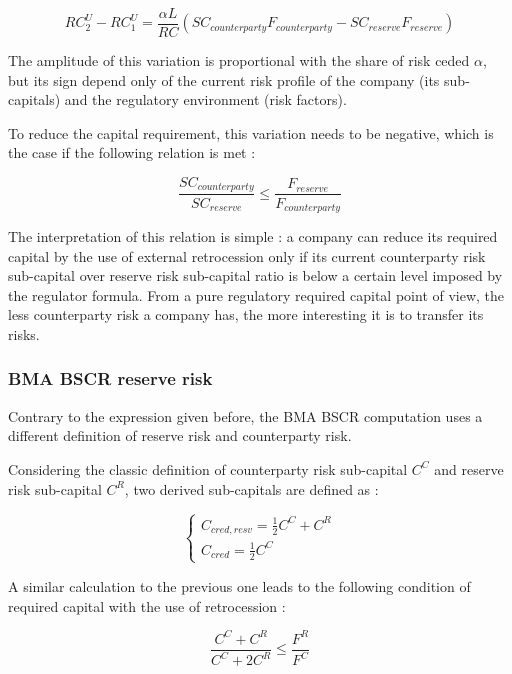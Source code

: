 \begin{equation}
	RC^U_2 - RC^U_1 = \frac{\alpha L}{RC} (SC_{counterparty} F_{counterparty} - SC_{reserve} F_{reserve})
\end{equation}

The amplitude of this variation is proportional with the share of risk ceded $\alpha$, but its sign depend only of the current risk profile of the company (its sub-capitals) and the regulatory environment (risk factors).

To reduce the capital requirement, this variation needs to be negative, which is the case if the following relation is met :

\begin{equation}
	\frac{SC_{counterparty}}{SC_{reserve}} \leq \frac{F_{reserve}}{F_{counterparty}}
\end{equation}

The interpretation of this relation is simple : a company can reduce its required capital by the use of external retrocession only if its current counterparty risk sub-capital over reserve risk sub-capital ratio is below a certain level imposed by the regulator formula. From  a pure regulatory required capital point of view, the less counterparty risk a company has, the more interesting it is to transfer its risks.

\subsubsection{BMA BSCR reserve risk}

Contrary to the expression given before, the BMA BSCR computation uses a different definition of reserve risk and counterparty risk.

Considering the classic definition of counterparty risk sub-capital $C^{C}$ and reserve risk sub-capital $C^{R}$, two derived sub-capitals are defined as :

$$
\left\{
    \begin{array}{ll}
        C_{cred,resv} = \frac{1}{2} C^{C} + C^{R}\\
        C_{cred} = \frac{1}{2} C^{C}
    \end{array}
\right.
$$

A similar calculation to the previous one leads to the following condition of required capital with the use of retrocession :

\begin{equation}
\label{eq:BSCR_1_condition}
	\frac{C^C + C^R}{C^C + 2C^R} \leq \frac{F^R}{F^C}
\end{equation}

